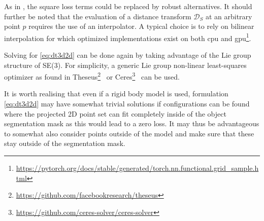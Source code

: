 As in , the square loss terms could be replaced by robust alternatives.
It should further be noted that the evaluation of a distance transform $\mathcal{D}_{S}$ at an arbitrary point $p$ requires the use of an interpolator.
A typical choice is to rely on bilinear interpolation for which optimized implementations exist on both \gls{cpu} and \gls{gpu}\footnote{\url{https://pytorch.org/docs/stable/generated/torch.nn.functional.grid_sample.html}}.

Solving for \eqref{eq:dt3d2d} can be done again by taking advantage of the Lie group structure of SE(3). For simplicity, a generic Lie group non-linear least-squares optimizer as found in Theseus\footnote{\url{https://github.com/facebookresearch/theseus}}~\cite{Pineda:NeurIPS:2023} or Ceres\footnote{\url{https://github.com/ceres-solver/ceres-solver}}~\cite{Agarwal:Ceres:2022} can be used.

It is worth realising that even if a rigid body model is used, formulation \eqref{eq:dt3d2d} may have somewhat trivial solutions if configurations can be found where the projected 2D point set can fit completely inside of the object segmentation mask as this would lead to a zero loss. It may thus be advantageous to somewhat also consider points outside of the model and make sure that these stay outside of the segmentation mask.
